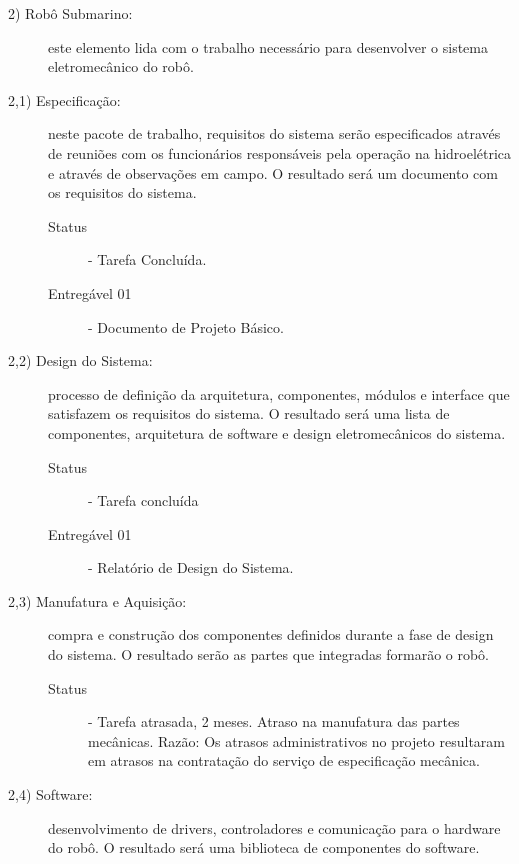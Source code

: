\begin{description}

\vspace{0,5cm}

\item[ 2)  Robô Submarino:] este elemento lida com o trabalho necessário para desenvolver o sistema eletromecânico do robô. 

\item[2,1) Especificação:] neste pacote de trabalho, requisitos do sistema serão especificados através de reuniões com os funcionários responsáveis pela operação na hidroelétrica e através de observações em campo. O resultado será um documento com os requisitos do sistema.

\begin{description}
	\item [Status] - Tarefa Concluída. 
	\item [Entregável 01] - Documento de Projeto Básico. 
\end{description} 

\item[2,2) Design do Sistema:] processo de definição da arquitetura, componentes, módulos e interface que satisfazem os requisitos do sistema. O resultado será uma lista de componentes, arquitetura de software e design eletromecânicos do sistema.

\begin{description}
	\item [Status] - Tarefa concluída
	\item [Entregável 01] - Relatório de Design do Sistema. 
\end{description} 

\item[2,3) Manufatura e Aquisição:] compra e construção dos componentes definidos durante a fase de design do sistema. O resultado serão as partes que integradas formarão o robô. 

\begin{description}
	\item [Status] - Tarefa atrasada, 2 meses. Atraso na manufatura das partes mecânicas. Razão: Os atrasos administrativos no projeto resultaram em atrasos na contratação do serviço de especificação mecânica. 
\end{description} 

\item[2,4) Software:] desenvolvimento de drivers, controladores e comunicação para o hardware do robô. O resultado será uma biblioteca de componentes  do software.


\end{description}
